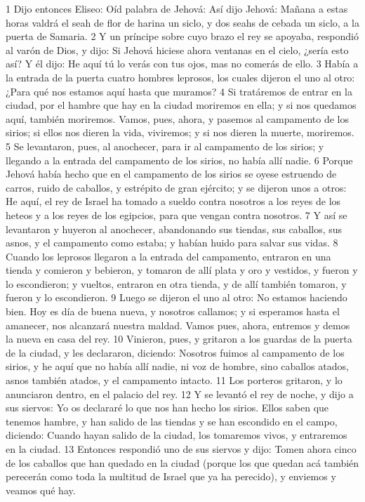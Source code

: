1 Dijo entonces Eliseo: Oíd palabra de Jehová: Así dijo Jehová: Mañana a estas horas valdrá el seah   de flor de harina un siclo, y dos seahs de cebada un siclo, a la puerta de Samaria.
2 Y un príncipe sobre cuyo brazo el rey se apoyaba, respondió al varón de Dios, y dijo: Si Jehová hiciese ahora ventanas en el cielo, ¿sería esto así? Y él dijo: He aquí tú lo verás con tus ojos, mas no comerás de ello.
3 Había a la entrada de la puerta cuatro hombres leprosos, los cuales dijeron el uno al otro: ¿Para qué nos estamos aquí hasta que muramos?
4 Si tratáremos de entrar en la ciudad, por el hambre que hay en la ciudad moriremos en ella; y si nos quedamos aquí, también moriremos. Vamos, pues, ahora, y pasemos al campamento de los sirios; si ellos nos dieren la vida, viviremos; y si nos dieren la muerte, moriremos.
5 Se levantaron, pues, al anochecer, para ir al campamento de los sirios; y llegando a la entrada del campamento de los sirios, no había allí nadie.
6 Porque Jehová había hecho que en el campamento de los sirios se oyese estruendo de carros, ruido de caballos, y estrépito de gran ejército; y se dijeron unos a otros: He aquí, el rey de Israel ha tomado a sueldo contra nosotros a los reyes de los heteos y a los reyes de los egipcios, para que vengan contra nosotros.
7 Y así se levantaron y huyeron al anochecer, abandonando sus tiendas, sus caballos, sus asnos, y el campamento como estaba; y habían huido para salvar sus vidas.
8 Cuando los leprosos llegaron a la entrada del campamento, entraron en una tienda y comieron y bebieron, y tomaron de allí plata y oro y vestidos, y fueron y lo escondieron; y vueltos, entraron en otra tienda, y de allí también tomaron, y fueron y lo escondieron.
9 Luego se dijeron el uno al otro: No estamos haciendo bien. Hoy es día de buena nueva, y nosotros callamos; y si esperamos hasta el amanecer, nos alcanzará nuestra maldad. Vamos pues, ahora, entremos y demos la nueva en casa del rey.
10 Vinieron, pues, y gritaron a los guardas de la puerta de la ciudad, y les declararon, diciendo: Nosotros fuimos al campamento de los sirios, y he aquí que no había allí nadie, ni voz de hombre, sino caballos atados, asnos también atados, y el campamento intacto.
11 Los porteros gritaron, y lo anunciaron dentro, en el palacio del rey.
12 Y se levantó el rey de noche, y dijo a sus siervos: Yo os declararé lo que nos han hecho los sirios. Ellos saben que tenemos hambre, y han salido de las tiendas y se han escondido en el campo, diciendo: Cuando hayan salido de la ciudad, los tomaremos vivos, y entraremos en la ciudad.
13 Entonces respondió uno de sus siervos y dijo: Tomen ahora cinco de los caballos que han quedado en la ciudad (porque los que quedan acá también perecerán como toda la multitud de Israel que ya ha perecido), y enviemos y veamos qué hay.
